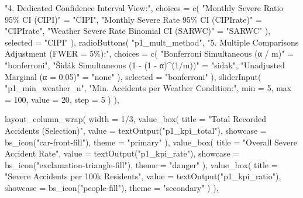 \documentclass[
  letterpaper,
  DIV=11,
  numbers=noendperiod]{scrartcl}
\newenvironment{Shaded}{\begin{snugshade}}{\end{snugshade}}
\newcommand{\AttributeTok}[1]{\textcolor[rgb]{0.40,0.45,0.13}{#1}}
\newcommand{\DecValTok}[1]{\textcolor[rgb]{0.68,0.00,0.00}{#1}}
\newcommand{\FunctionTok}[1]{\textcolor[rgb]{0.28,0.35,0.67}{#1}}
\newcommand{\NormalTok}[1]{\textcolor[rgb]{0.00,0.23,0.31}{#1}}
\newcommand{\OtherTok}[1]{\textcolor[rgb]{0.00,0.23,0.31}{#1}}
\newcommand{\SpecialCharTok}[1]{\textcolor[rgb]{0.37,0.37,0.37}{#1}}
\newcommand{\StringTok}[1]{\textcolor[rgb]{0.13,0.47,0.30}{#1}}
\newcounter{none} %
\begin{document}
\begin{Shaded}
\begin{Highlighting}[]
          \StringTok{"4. Dedicated Confidence Interval View:"}\NormalTok{,}
          \AttributeTok{choices =} \FunctionTok{c}\NormalTok{(}
            \StringTok{"Monthly Severe Ratio 95\% CI (CIPI)"}      \OtherTok{=} \StringTok{"CIPI"}\NormalTok{,}
            \StringTok{"Monthly Severe Rate 95\% CI (CIPIrate)"}   \OtherTok{=} \StringTok{"CIPIrate"}\NormalTok{,}
            \StringTok{"Weather Severe Rate Binomial CI (SARWC)"} \OtherTok{=} \StringTok{"SARWC"}
\NormalTok{          ),}
          \AttributeTok{selected =} \StringTok{"CIPI"}
\NormalTok{        ),}
        \FunctionTok{radioButtons}\NormalTok{(}
          \StringTok{"p1\_mult\_method"}\NormalTok{,}
          \StringTok{"5. Multiple Comparisons Adjustment (FWER = 5\%):"}\NormalTok{,}
          \AttributeTok{choices =} \FunctionTok{c}\NormalTok{(}
            \StringTok{"Bonferroni Simultaneous (α / m)"}        \OtherTok{=} \StringTok{"bonferroni"}\NormalTok{,}
            \StringTok{"Šidák Simultaneous (1 {-} (1 {-} α)\^{}(1/m))"} \OtherTok{=} \StringTok{"sidak"}\NormalTok{,}
            \StringTok{"Unadjusted Marginal (α = 0.05)"}         \OtherTok{=} \StringTok{"none"}
\NormalTok{          ),}
          \AttributeTok{selected =} \StringTok{"bonferroni"}
\NormalTok{        ),}
        \FunctionTok{sliderInput}\NormalTok{(}
          \StringTok{"p1\_min\_weather\_n"}\NormalTok{,}
          \StringTok{"Min. Accidents per Weather Condition:"}\NormalTok{,}
          \AttributeTok{min =} \DecValTok{5}\NormalTok{, }\AttributeTok{max =} \DecValTok{100}\NormalTok{, }\AttributeTok{value =} \DecValTok{20}\NormalTok{, }\AttributeTok{step =} \DecValTok{5}
\NormalTok{        )}
\NormalTok{      ),}

      \FunctionTok{layout\_column\_wrap}\NormalTok{(}
        \AttributeTok{width =} \DecValTok{1}\SpecialCharTok{/}\DecValTok{3}\NormalTok{,}
        \FunctionTok{value\_box}\NormalTok{(}
          \AttributeTok{title =} \StringTok{"Total Recorded Accidents (Selection)"}\NormalTok{,}
          \AttributeTok{value =} \FunctionTok{textOutput}\NormalTok{(}\StringTok{"p1\_kpi\_total"}\NormalTok{),}
          \AttributeTok{showcase =} \FunctionTok{bs\_icon}\NormalTok{(}\StringTok{"car{-}front{-}fill"}\NormalTok{),}
          \AttributeTok{theme =} \StringTok{"primary"}
\NormalTok{        ),}
        \FunctionTok{value\_box}\NormalTok{(}
          \AttributeTok{title =} \StringTok{"Overall Severe Accident Rate"}\NormalTok{,}
          \AttributeTok{value =} \FunctionTok{textOutput}\NormalTok{(}\StringTok{"p1\_kpi\_rate"}\NormalTok{),}
          \AttributeTok{showcase =} \FunctionTok{bs\_icon}\NormalTok{(}\StringTok{"exclamation{-}triangle{-}fill"}\NormalTok{),}
          \AttributeTok{theme =} \StringTok{"danger"}
\NormalTok{        ),}
        \FunctionTok{value\_box}\NormalTok{(}
          \AttributeTok{title =} \StringTok{"Severe Accidents per 100k Residents"}\NormalTok{,}
          \AttributeTok{value =} \FunctionTok{textOutput}\NormalTok{(}\StringTok{"p1\_kpi\_ratio"}\NormalTok{),}
          \AttributeTok{showcase =} \FunctionTok{bs\_icon}\NormalTok{(}\StringTok{"people{-}fill"}\NormalTok{),}
          \AttributeTok{theme =} \StringTok{"secondary"}
\NormalTok{        )}
\NormalTok{      ),}


\end{Highlighting}
\end{Shaded}
\end{document}
